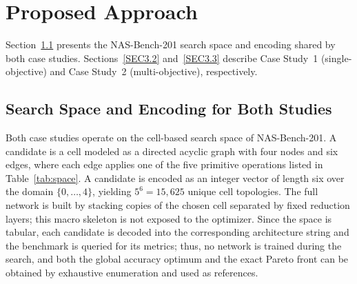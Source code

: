 \documentclass[runningheads]{llncs}
\begin{document}

\section{Proposed Approach} \label{SEC3}
\noindent Section~\ref{SEC3.1} presents the NAS-Bench-201 search space and encoding shared by both case studies. Sections~\ref{SEC3.2} and~\ref{SEC3.3} describe Case Study~1 (single-objective) and Case Study~2 (multi-objective), respectively.

%
%
\subsection{Search Space and Encoding for Both Studies} \label{SEC3.1}
Both case studies operate on the cell-based search space of NAS-Bench-201. A candidate is a cell modeled as a directed acyclic graph with four nodes and six edges, where each edge applies one of the five primitive operations listed in Table~\ref{tab:space}. A candidate is encoded as an integer vector of length six over the domain $\{0,\dots,4\}$, yielding $5^6 = 15{,}625$ unique cell topologies. The full network is built by stacking copies of the chosen cell separated by fixed reduction layers; this macro skeleton is not exposed to the optimizer. Since the space is tabular, each candidate is decoded into the corresponding architecture string and the benchmark is queried for its metrics; thus, no network is trained during the search, and both the global accuracy optimum and the exact Pareto front can be obtained by exhaustive enumeration and used as references.
\end{document}
